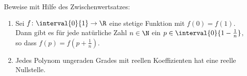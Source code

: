 \begin{prob}
  Beweise mit Hilfe des Zwischenwertsatzes:
  \begin{enumerate}[label=(\alph*)]
  \item Sei $f \colon \interval{0}{1} \to \R$ eine stetige Funktion mit
    $f(0) = f(1)$. Dann gibt es für jede natürliche Zahl $n \in \N$ ein
    $p \in \interval{0}{1 - \frac{1}{n}}$, so dass $f(p) = f(p + \frac{1}{n})$.
  \item Jedes Polynom ungeraden Grades mit reellen Koeffizienten hat eine reelle
    Nullstelle.
  \end{enumerate}
\end{prob}
